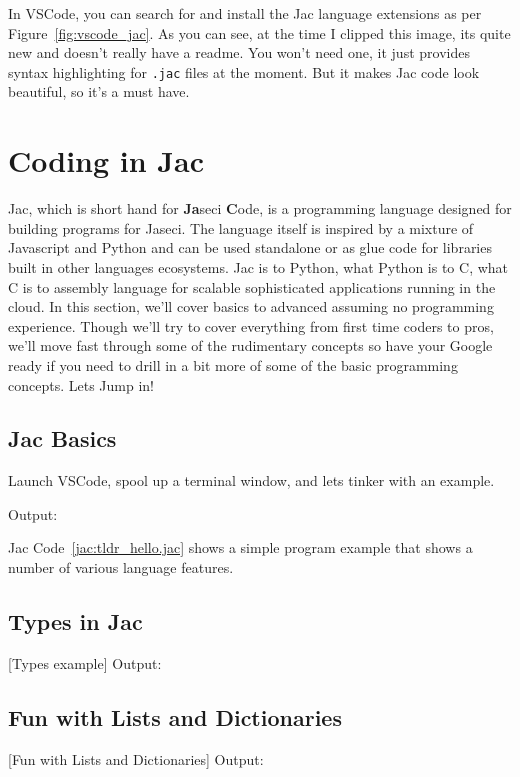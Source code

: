 \par
In VSCode, you can search for and install the Jac language extensions as per Figure~\ref{fig:vscode_jac}. As you can see, at the time I clipped this image, its quite new and doesn't really have a readme. You won't need one, it just provides syntax highlighting for \texttt{.jac} files at the moment. But it makes Jac code look beautiful, so it's a must have.

\section{Coding in Jac}

Jac, which is short hand for \textbf{Ja}seci \textbf{C}ode,  is a programming language designed for building programs for Jaseci. The language itself is inspired by a mixture of Javascript and Python and can be used standalone or as glue code for libraries built in other languages ecosystems. Jac is to Python, what Python is to C, what C is to assembly language for scalable sophisticated applications running in the cloud. In this section, we'll cover basics to advanced assuming no programming experience. Though we'll try to cover everything from first time coders to pros, we'll move fast through some of the rudimentary concepts so have your Google ready if you need to drill in a bit more of some of the basic programming concepts. Lets Jump in!

\subsection{Jac Basics}

Launch VSCode, spool up a terminal window, and lets tinker with an example.
\par
{}
Output:

Jac Code~\ref{jac:tldr_hello.jac} shows a simple program example that shows a number of various language features.

\subsection{Types in Jac}
[Types example]
Output:

\subsection{Fun with Lists and Dictionaries}
[Fun with Lists and Dictionaries]
Output:

